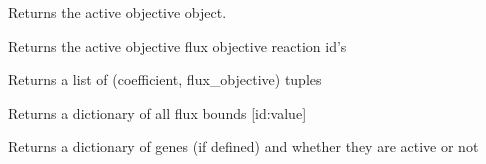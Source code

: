 \documentclass[a4paper,11pt,english]{sphinxmanual}
\begin{document}
\begin{fulllineitems}
\begin{fulllineitems}
\begin{itemize}
\end{itemize}

\end{fulllineitems}


\begin{fulllineitems}
\label{modules_doc:cbmpy.CBModel.Model.getActiveObjective}
Returns the active objective object.

\end{fulllineitems}


\begin{fulllineitems}
\label{modules_doc:cbmpy.CBModel.Model.getActiveObjectiveReactionIds}
Returns the active objective flux objective reaction id's

\end{fulllineitems}


\begin{fulllineitems}
\label{modules_doc:cbmpy.CBModel.Model.getActiveObjectiveStoichiometry}
Returns a list of (coefficient, flux\_objective) tuples

\end{fulllineitems}


\begin{fulllineitems}
\label{modules_doc:cbmpy.CBModel.Model.getAllFluxBounds}
Returns a dictionary of all flux bounds {[}id:value{]}

\end{fulllineitems}


\begin{fulllineitems}
\label{modules_doc:cbmpy.CBModel.Model.getAllGeneActivities}
Returns a dictionary of genes (if defined) and whether they are active or not


\end{fulllineitems}
\end{fulllineitems}
\end{document}
